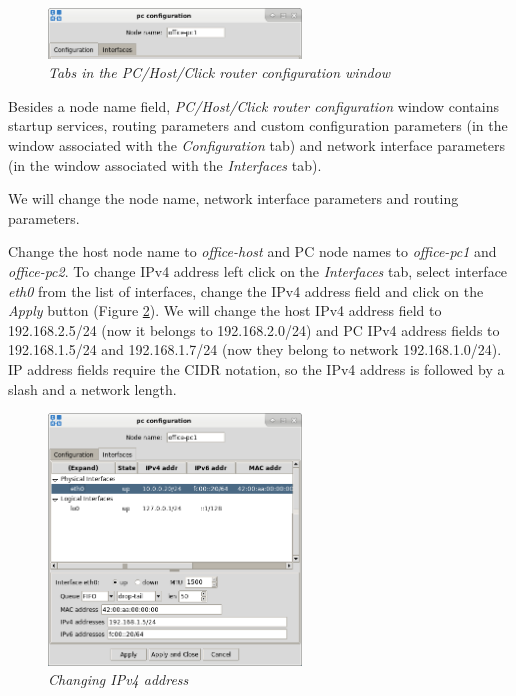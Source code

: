 \begin{figure}[H]
\centering
\vspace{10pt}
\includegraphics[width=0.6\textwidth]{./images/pc_config_tabs.png}
\caption{\emph{Tabs in the PC/Host/Click router configuration window}}
\label{fig:pc_config_tabs}
\end{figure}

Besides a node name field, \emph{PC/Host/Click router configuration} window
contains startup services, routing parameters and custom configuration
parameters (in the window associated with the \emph{Configuration} tab) and
network interface parameters (in the window associated with the
\emph{Interfaces} tab).

We will change the node name, network interface parameters and routing
parameters.

Change the host node name to \emph{office-host} and PC node names to
\emph{office-pc1} and \emph{office-pc2}.
To change IPv4 address left click on the \emph{Interfaces} tab, select
interface \emph{eth0} from the list of interfaces, change the IPv4 address
field and click on the \emph{Apply} button (Figure \ref{fig:pc_config_ipv4}).
We will change the host IPv4 address field to 192.168.2.5/24 (now it belongs to
192.168.2.0/24) and PC IPv4 address fields to 192.168.1.5/24 and 192.168.1.7/24
(now they belong to network 192.168.1.0/24). IP address fields require the CIDR
notation, so the IPv4 address is followed by a slash and a network length.

\begin{figure}[H]
\centering
\vspace{10pt}
\includegraphics[width=0.6\textwidth]{./images/pc_config_ipv4.png}
\caption{\emph{Changing IPv4 address}}
\label{fig:pc_config_ipv4}
\end{figure}

